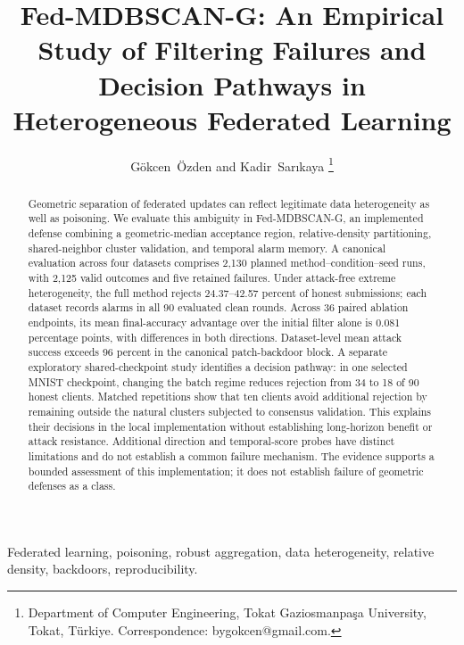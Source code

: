 \documentclass[journal]{IEEEtran}
\newcommand{\method}{Fed-MDBSCAN-G}
\begin{document}
\title{\method{}: An Empirical Study of Filtering Failures and Decision Pathways in Heterogeneous Federated Learning}
\author{G\"okcen~\"Ozden and Kadir~Sar{\i}kaya%
\thanks{Department of Computer Engineering, Tokat Gaziosmanpa\c{s}a University, Tokat, T\"urkiye. Correspondence: bygokcen@gmail.com.}}
\maketitle
\begin{abstract}
Geometric separation of federated updates can reflect legitimate data heterogeneity as well as poisoning. We evaluate this ambiguity in Fed-MDBSCAN-G, an implemented defense combining a geometric-median acceptance region, relative-density partitioning, shared-neighbor cluster validation, and temporal alarm memory. A canonical evaluation across four datasets comprises 2,130 planned method--condition--seed runs, with 2,125 valid outcomes and five retained failures. Under attack-free extreme heterogeneity, the full method rejects 24.37--42.57 percent of honest submissions; each dataset records alarms in all 90 evaluated clean rounds. Across 36 paired ablation endpoints, its mean final-accuracy advantage over the initial filter alone is 0.081 percentage points, with differences in both directions. Dataset-level mean attack success exceeds 96 percent in the canonical patch-backdoor block. A separate exploratory shared-checkpoint study identifies a decision pathway: in one selected MNIST checkpoint, changing the batch regime reduces rejection from 34 to 18 of 90 honest clients. Matched repetitions show that ten clients avoid additional rejection by remaining outside the natural clusters subjected to consensus validation. This explains their decisions in the local implementation without establishing long-horizon benefit or attack resistance. Additional direction and temporal-score probes have distinct limitations and do not establish a common failure mechanism. The evidence supports a bounded assessment of this implementation; it does not establish failure of geometric defenses as a class.
\end{abstract}
\begin{IEEEkeywords}
Federated learning, poisoning, robust aggregation, data heterogeneity, relative density, backdoors, reproducibility.
\end{IEEEkeywords}
\IEEEpeerreviewmaketitle
\end{document}
